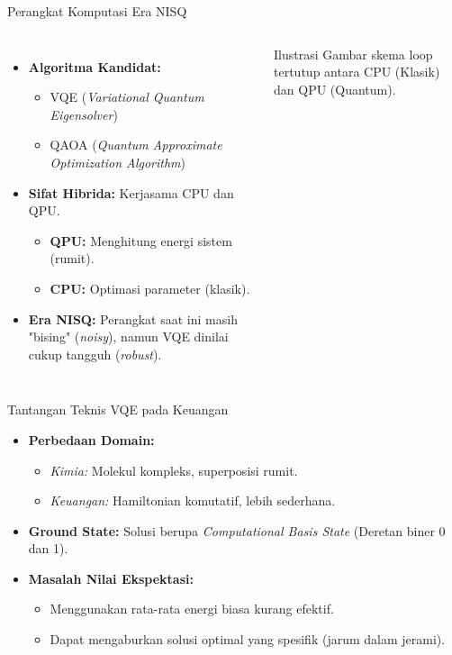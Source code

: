 \documentclass[10pt]{beamer}
\begin{document}
\begin{frame}{Perangkat Komputasi Era NISQ}
    \begin{columns}
        \begin{itemize}
            \item \textbf{Algoritma Kandidat:}
            \begin{itemize}
                \item VQE (\textit{Variational Quantum Eigensolver})
                \item QAOA (\textit{Quantum Approximate Optimization Algorithm})
            \end{itemize}
            \item \textbf{Sifat Hibrida:} Kerjasama CPU dan QPU.
            \begin{itemize}
                \item \textbf{QPU:} Menghitung energi sistem (rumit).
                \item \textbf{CPU:} Optimasi parameter (klasik).
            \end{itemize}
            \item \textbf{Era NISQ:} Perangkat saat ini masih "bising" (\textit{noisy}), namun VQE dinilai cukup tangguh (\textit{robust}).
        \end{itemize}
        
        \begin{exampleblock}{Ilustrasi}
            \centering
            Gambar skema loop tertutup antara CPU (Klasik) dan QPU (Quantum).
        \end{exampleblock}
    \end{columns}
\end{frame}

\begin{frame}{Tantangan Teknis VQE pada Keuangan}
    \begin{itemize}
        \item \textbf{Perbedaan Domain:}
        \begin{itemize}
            \item \textit{Kimia:} Molekul kompleks, superposisi rumit.
            \item \textit{Keuangan:} Hamiltonian komutatif, lebih sederhana.
        \end{itemize}
        \item \textbf{Ground State:} Solusi berupa \textit{Computational Basis State} (Deretan biner 0 dan 1).
        \item \textbf{Masalah Nilai Ekspektasi:}
        \begin{itemize}
            \item Menggunakan rata-rata energi biasa kurang efektif.
            \item Dapat mengaburkan solusi optimal yang spesifik (jarum dalam jerami).
        \end{itemize}
    \end{itemize}
\end{frame}
\end{document}
